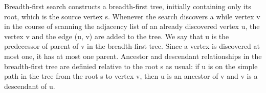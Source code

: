 \documentclass[preview]{standalone}
\begin{document}
\begin{center}
Breadth-first search constructs a breadth-first tree, initially containing only its root, which is the source vertex s. Whenever the search discovers a while vertex v in the course of scanning the adjacency list of an already discovered vertex u, the vertex v and the edge (u, v) are added to the tree. We say that u is the predecessor of parent of v in the breadth-first tree. Since a vertex is discovered at most one, it has at most one parent. Ancestor and descendant relationships in the breadth-first tree are definied relative to the root s as usual: if u is on the simple path in the tree from the root s to vertex v, then u is an ancestor of v and v is a descendant of u.
\end{center}
\end{document}
